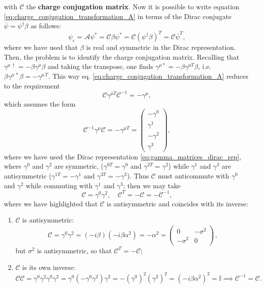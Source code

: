 with \(\mathcal{C}\) the \textbf{charge conjugation matrix}. Now it is possible to write equation \eqref{eq:charge_conjugation_transformation_A} in terms of the Dirac conjugate \(\overline{\psi} = \psi^{\dagger} \beta\) as follows:
\begin{equation}
    \psi_c = \mathcal{A} \psi^* = \mathcal{C} \beta \psi^*= \mathcal{C} (\psi^\dagger \beta)^T = \mathcal{C} \overline{\psi}^T,
\end{equation}
where we have used that \(\beta\) is real and symmetric in the Dirac representation. Then, the problem is to identify the charge conjugation matrix. Recalling that \(\gamma^{\mu\,\dagger} = -\beta \gamma^\mu \beta\) and taking the transpose, one finds \(\gamma^{\mu *} = -\beta \gamma^{\mu T} \beta\), i.e. \(\beta \gamma^{\mu\,*} \beta = - \gamma^{\mu\,T}\). This way eq. \eqref{eq:charge_conjugation_transformation_A} reduces to the requirement
\begin{equation}
    \mathcal{C} \gamma^{\mu T} \mathcal{C}^{-1} = - \gamma^{\mu},
    \label{eq:charge_conjugation_gamma_condition_C}
\end{equation}
which assumes the form
\[
    \mathcal{C}^{-1} \gamma^{\mu} \mathcal{C} = - \gamma^{\mu T} = \begin{pmatrix}
        -\gamma^{0} \\
        \gamma^{1}  \\
        -\gamma^{2} \\
        \gamma^{3}
    \end{pmatrix},
\]
where we have used the Dirac representation \eqref{eq:gamma_matrices_dirac_rep}, where \(\gamma^0\) and \(\gamma^2\) are symmetric, (\(\gamma^{0 T} = \gamma^0\)
and \(\gamma^{2 T} = \gamma^2\)) while \(\gamma^1\) and \(\gamma^3\) are antisymmetric (\(\gamma^{1 T} = -\gamma^1\) and \(\gamma^{3 T} = -\gamma^3\)). Thus \(\mathcal{C}\) must anticommute with \(\gamma^0\) and \(\gamma^2\) while commuting with \(\gamma^1\) and \(\gamma^3\); then we may take
\begin{equation}
    \mathcal{C} = \gamma^0\gamma^2, \quad \mathcal{C}^T = -\mathcal{C} = - \mathcal{C}^{-1},
    \label{eq:charge_conjugation_matrix_C}
\end{equation}
where we have highlighted that \(\mathcal{C}\) is antisymmetric and coincides with its inverse:
\begin{enumerate}
    \item \(\mathcal{C}\) is antisymmetric:
          \[
              \mathcal{C} = \gamma^0 \gamma^2 = (-i \beta)(-i \beta \alpha^2) = -\alpha^2 = \begin{pmatrix}
                  0         & -\sigma^2 \\
                  -\sigma^2 & 0
              \end{pmatrix},
          \]
          but \(\sigma^2\) is antisymmetric, so that \(\mathcal{C}^T = -\mathcal{C}\);
    \item \(\mathcal{C}\) is its own inverse:
          \[
              \mathcal{C} \mathcal{C} = \gamma^0 \gamma^2 \gamma^0 \gamma^2 = \gamma^0 (-\gamma^0 \gamma^2) \gamma^2 = - (\gamma^0)^2 (\gamma^2)^2 = (-i \beta \alpha^2)^2 = \mathbb{I} \implies \mathcal{C}^{-1} = \mathcal{C}.
          \]
\end{enumerate}
